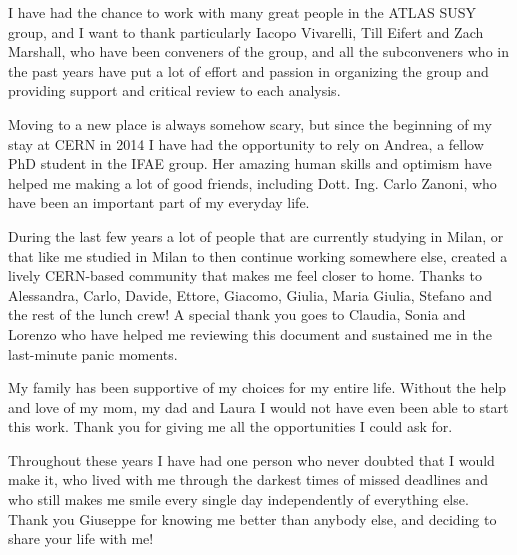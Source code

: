 \par\medskip
I have had the chance to work with many great people in the ATLAS SUSY group, and 
I want to thank particularly Iacopo Vivarelli, Till Eifert and Zach Marshall, who have been conveners of the group,
and all the subconveners who in the past years 
have put a lot of effort and passion in organizing the group and providing support and critical review 
to each analysis. 

\par\medskip 
Moving to a new place is always somehow scary, but since the beginning of my 
stay at CERN in 2014 I have had the opportunity to rely on Andrea, a fellow PhD student in the 
IFAE group. 
Her amazing human skills and optimism have helped me making a lot of good friends, including Dott. Ing. 
Carlo Zanoni, who have been an important part of my everyday life. 

\par\medskip

During the last few years a lot of people that are currently studying in Milan, or that like me 
studied in Milan to then continue working somewhere else, created a lively CERN-based community that 
makes me feel closer to home. 
Thanks to Alessandra, Carlo, Davide, Ettore, Giacomo, Giulia, Maria Giulia, Stefano and the rest of the 
lunch crew! A special thank you goes to Claudia, Sonia and Lorenzo who have helped me reviewing this document and 
sustained me in the last-minute panic moments. 

\par\medskip 
My family has been supportive of my choices for my entire life. 
Without the help and love of my mom, my dad and Laura I would not have even been able to start this work. 
Thank you for giving me all the opportunities I could ask for. 

\par\medskip 
Throughout these years I have had one person who never doubted that I would make it, 
who lived with me through the darkest times of missed deadlines 
and who still makes me smile every single day independently 
of everything else. 
Thank you Giuseppe for knowing me better than anybody else, 
and deciding to share your life with me! 


